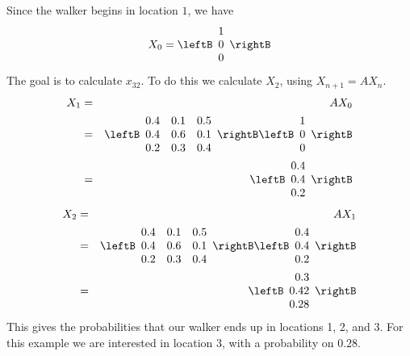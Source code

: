 \begin{solution}
Since the walker begins in location $1$, we have 
\[
X_{0} = \leftB
\begin{array}{c}
1 \\
0 \\
0
\end{array}
\rightB
\]
The goal is to calculate $x_{32}$. To do this we calculate $X_{2}$, using $X_{n+1} = AX_{n}$.
\begin{eqnarray*}
X_{1} &=& A X_{0} \\
&=& \leftB
\begin{array}{rrr}
0.4 & 0.1 & 0.5 \\
0.4 & 0.6 & 0.1 \\
0.2 & 0.3 & 0.4
\end{array}
\rightB \leftB
\begin{array}{c}
1 \\
0 \\
0
\end{array}
\rightB \\
&=& 
\leftB 
\begin{array}{r}
0.4 \\
0.4 \\
0.2
\end{array}
\rightB \\
\end{eqnarray*}
\begin{eqnarray*}
X_{2} &=& A X_{1} \\
&=& \leftB
\begin{array}{rrr}
0.4 & 0.1 & 0.5 \\
0.4 & 0.6 & 0.1 \\
0.2 & 0.3 & 0.4
\end{array}
\rightB \leftB
\begin{array}{c}
0.4 \\
0.4 \\
0.2
\end{array}
\rightB \\
&=& 
\leftB 
\begin{array}{r}
0.3 \\
0.42 \\
0.28
\end{array}
\rightB \\
\end{eqnarray*}
This gives the probabilities that our walker ends up in locations 1, 2, and 3. For this example we are interested in location 3, with a probability on $0.28$.
\end{solution}

